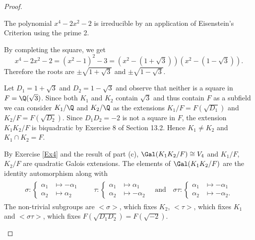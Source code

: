 \documentclass[10pt]{amsart}
\begin{document}
\begin{thm}
  \begin{proof}
  \begin{alphaenum}
    \item
      The polynomial $x^4 - 2x^2 - 2$ is irreducible by an application of Eisenstein's Criterion using the prime 2.
    \item
      By completing the square, we get $$x^4 - 2x^2 - 2 = (x^2 - 1)^2 -3 = (x^2 - (1 + \sqrt{3}))(x^2 - (1 - \sqrt{3})).$$
      Therefore the roots are $\pm \sqrt{1 + \sqrt{3}}$ and $\pm \sqrt{1 - \sqrt{3}}$.
    \item
      Let $D_1 = 1 + \sqrt{3}$ and $D_2 = 1 - \sqrt{3}$ and observe that neither is a square in $F = \Q(\sqrt{3})$.
      Since both $K_1$ and $K_2$ contain $\sqrt{3}$ and thus contain $F$ as a subfield we can consider $K_1/\Q$ and $K_2/\Q$ as the extensions $K_1/F = F(\sqrt{D_1})$ and $K_2/F = F(\sqrt{D_2})$.
      Since $D_1D_2 = -2$ is not a square in $F$, the extension $K_1K_2/F$ is biquadratic by Exercise 8 of Section 13.2.
      Hence $K_1 \not = K_2$ and $K_1 \cap K_2 = F$.
    \item
      By Exercise \ref{Ex4} and the result of part (c), $\Gal(K_1K_2/F) \cong V_4$ and $K_1/F$, $K_2/F$ are quadratic Galois extensions.
      The elements of $\Gal(K_1K_2/F)$ are the identity automorphism along with
      \begin{align*}
        \begin{split}
          \sigma : \begin{cases}
            \alpha_1 & \longmapsto -\alpha_1\\
            \alpha_2 & \longmapsto \alpha_2
          \end{cases}
          \qquad
          \tau : \begin{cases}
            \alpha_1 & \longmapsto \alpha_1\\
            \alpha_2 & \longmapsto -\alpha_2
          \end{cases}
          \quad \text{and} \quad
          \sigma\tau : \begin{cases}
            \alpha_1 & \longmapsto -\alpha_1\\
            \alpha_2 & \longmapsto -\alpha_2.
          \end{cases}
        \end{split}
      \end{align*}
      The non-trivial subgroups are $<\sigma>$, which fixes $K_2$, $<\tau>$, which fixes $K_1$ and $<\sigma\tau>$, which fixes $F(\sqrt{D_1D_2}) = F(\sqrt{-2})$.

\end{alphaenum}
\end{proof}
\end{thm}
\end{document}
